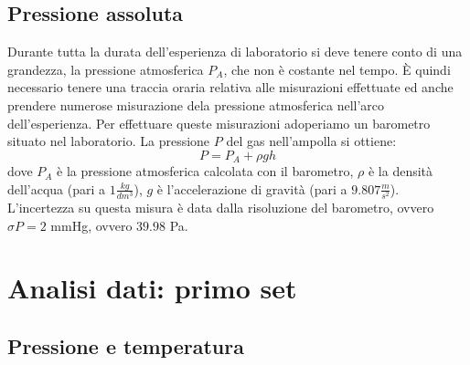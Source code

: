 \subsection{Pressione assoluta}
Durante tutta la durata dell'esperienza di laboratorio si deve tenere conto di una grandezza, la pressione atmosferica $P_A$, che non è costante nel tempo.
È quindi necessario tenere una traccia oraria relativa alle misurazioni effettuate ed anche prendere numerose misurazione dela pressione atmosferica nell'arco dell'esperienza.
Per effettuare queste misurazioni adoperiamo un barometro situato nel laboratorio.
La pressione $P$ del gas nell'ampolla si ottiene:
\begin{equation}
P = P_A + \rho g h
\end{equation}
dove $P_A$ è la pressione atmosferica calcolata con il barometro, $\rho$ è la densità dell'acqua (pari a $1 \frac{kg}{dm^3}$), $g$
è l'accelerazione di gravità (pari a $9.807 \frac{m}{s^2}$).
L'incertezza su questa misura è data dalla risoluzione del barometro, ovvero $\sigma P = 2$ mmHg, ovvero $39.98$ Pa.

\section{Analisi dati: primo set}
\subsection{Pressione e temperatura}

